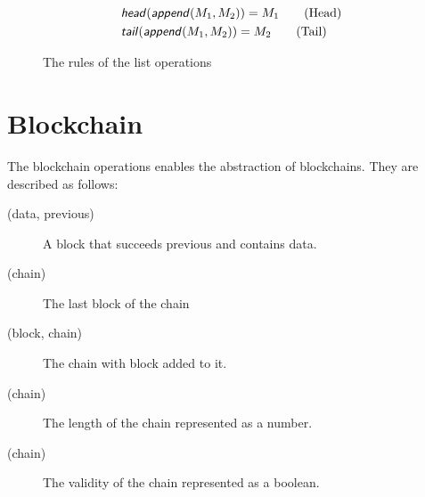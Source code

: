 \begin{figure}[h]
	\begin{align*}
		&\text{\sffamily \textit{head}\normalfont}(\text{\sffamily \textit{append}\normalfont}(M_1, M_2)) = M_1 \tag{Head} \\
		&\text{\sffamily \textit{tail}\normalfont}(\text{\sffamily \textit{append}\normalfont}(M_1, M_2)) = M_2 \tag{Tail}
	\end{align*}
	\caption{The rules of the list operations}
	\label{listoprules}
\end{figure}
\FloatBarrier

\section{Blockchain}

The blockchain operations enables the abstraction of blockchains.
They are described as follows:

\begin{description}
	\item[(data, previous)]
	A block that succeeds previous and contains data.
	\item[(chain)]
	The last block of the chain
	\item[(block, chain)]
	The chain with block added to it.
	\item[(chain)]
	The length of the chain represented as a number.
	\item[(chain)]
	The validity of the chain represented as a boolean.
\end{description}
